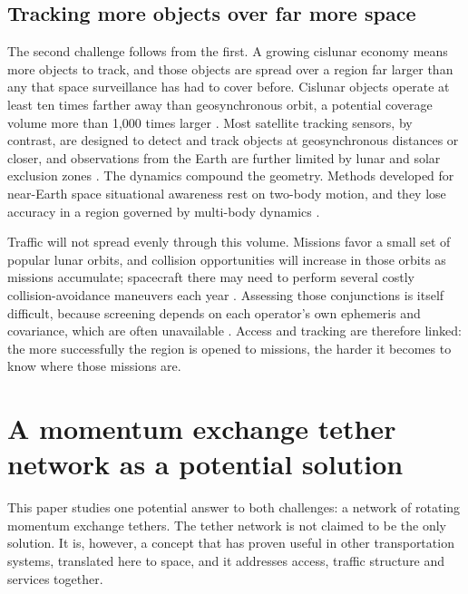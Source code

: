 \documentclass[11pt]{article}
\begin{document}
\subsection{Tracking more objects over far more space}

The second challenge follows from the first.
A growing cislunar economy means more objects to track, and those objects are spread over a region far larger than any that space surveillance has had to cover before.
Cislunar objects operate at least ten times farther away than geosynchronous orbit, a potential coverage volume more than 1{,}000 times larger \parencite{AFRLOracle}.
Most satellite tracking sensors, by contrast, are designed to detect and track objects at geosynchronous distances or closer, and observations from the Earth are further limited by lunar and solar exclusion zones \parencite{AFRLOracle}.
The dynamics compound the geometry.
Methods developed for near-Earth space situational awareness rest on two-body motion, and they lose accuracy in a region governed by multi-body dynamics \parencite{BakerMcEvilly2024}.

Traffic will not spread evenly through this volume.
Missions favor a small set of popular lunar orbits, and collision opportunities will increase in those orbits as missions accumulate; spacecraft there may need to perform several costly collision-avoidance maneuvers each year \parencite{GaTech2025Cislunar}.
Assessing those conjunctions is itself difficult, because screening depends on each operator's own ephemeris and covariance, which are often unavailable \parencite{Lechtenberg2024}.
Access and tracking are therefore linked: the more successfully the region is opened to missions, the harder it becomes to know where those missions are.

\section{A momentum exchange tether network as a potential solution}\label{sec:tethers}

This paper studies one potential answer to both challenges: a network of rotating momentum exchange tethers.
The tether network is not claimed to be the only solution.
It is, however, a concept that has proven useful in other transportation systems, translated here to space, and it addresses access, traffic structure and services together.
\end{document}
